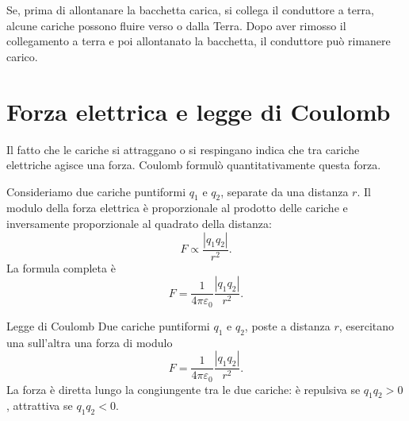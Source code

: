 \documentclass[a4paper]{article}
\begin{document}
Se, prima di allontanare la bacchetta carica, si collega il conduttore a terra, alcune cariche possono fluire verso o dalla Terra. Dopo aver rimosso il collegamento a terra e poi allontanato la bacchetta, il conduttore può rimanere carico.

\begin{center}
\end{center}

\section{Forza elettrica e legge di Coulomb}

Il fatto che le cariche si attraggano o si respingano indica che tra cariche elettriche agisce una forza. Coulomb formulò quantitativamente questa forza.

Consideriamo due cariche puntiformi \(q_1\) e \(q_2\), separate da una distanza \(r\). Il modulo della forza elettrica è proporzionale al prodotto delle cariche e inversamente proporzionale al quadrato della distanza:
\[
    F\propto \frac{|q_1q_2|}{r^2}.
\]
La formula completa è
\[
    F=\frac{1}{4\pi\varepsilon_0}\frac{|q_1q_2|}{r^2}.
\]

\begin{snippettheorem}{Legge di Coulomb}
    Due cariche puntiformi \(q_1\) e \(q_2\), poste a distanza \(r\), esercitano una sull'altra una forza di modulo
    \[
        F=\frac{1}{4\pi\varepsilon_0}\frac{|q_1q_2|}{r^2}.
    \]
    La forza è diretta lungo la congiungente tra le due cariche: è repulsiva se \(q_1q_2>0\), attrattiva se \(q_1q_2<0\).
\end{snippettheorem}

\begin{center}
\end{center}
\end{document}

